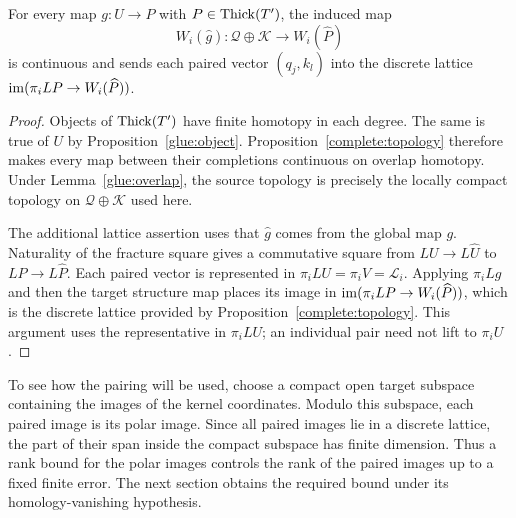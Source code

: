 \begin{lemma}
\label{glue:global-maps}
For every map $g:U\to P$ with $P\in\operatorname{Thick}(T')$, the induced map
\[
 W_i(\widehat g):\mathcal Q\oplus\mathcal K
                    \longrightarrow W_i(\widehat P)
\]
is continuous and sends each paired vector $(q_j,k_l)$ into the
discrete lattice $\operatorname{im}(\pi_iLP\to W_i(\widehat P))$.
\end{lemma}

\begin{proof}
Objects of $\operatorname{Thick}(T')$ have finite homotopy in each degree. The
same is true of $U$ by Proposition~\ref{glue:object}.
Proposition~\ref{complete:topology} therefore makes every map between
their completions continuous on overlap homotopy. Under
Lemma~\ref{glue:overlap}, the source topology is precisely the
locally compact topology on $\mathcal Q\oplus\mathcal K$ used here.

The additional lattice assertion uses that $\widehat g$ comes from
the global map $g$. Naturality of the fracture square gives a
commutative square from $LU\to L\widehat U$ to
$LP\to L\widehat P$. Each paired vector is represented in
$\pi_iLU=\pi_iV=\mathcal L_i$. Applying $\pi_iLg$ and then the
target structure map places its image in
$\operatorname{im}(\pi_iLP\to W_i(\widehat P))$, which is the discrete lattice
provided by Proposition~\ref{complete:topology}. This argument
uses the representative in $\pi_iLU$; an individual pair need not
lift to $\pi_iU$.
\end{proof}

To see how the pairing will be used, choose a compact open target
subspace containing the images of the kernel coordinates. Modulo
this subspace, each paired image is its polar image. Since all paired
images lie in a discrete lattice, the part of their span inside the
compact subspace has finite dimension. Thus a rank bound for the
polar images controls the rank of the paired images up to a fixed
finite error. The next section obtains the required bound under its
homology-vanishing hypothesis.
